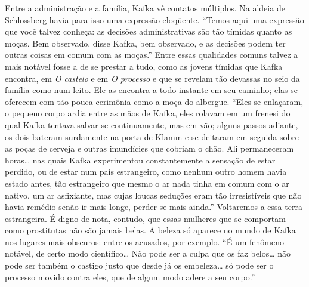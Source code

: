Entre a administração e a família, Kafka vê contatos múltiplos. Na
aldeia de Schlossberg havia para isso uma expressão eloqüente. ``Temos
aqui uma expressão que você talvez conheça: as decisões administrativas
são tão tímidas quanto as moças. Bem observado, disse Kafka, bem
observado, e as decisões podem ter outras coisas em comum com as
moças.'' Entre essas qualidades comuns talvez a mais notável fosse a de
se prestar a tudo, como as jovens tímidas que Kafka encontra, em \textit{O
castelo} e em \textit{O processo} e que se revelam tão devassas no seio da
família como num leito. Ele as encontra a todo instante em seu caminho;
elas se oferecem com tão pouca cerimônia como a moça do albergue. ``Eles
se enlaçaram, o pequeno corpo ardia entre as mãos de Kafka, eles rolavam
em um frenesi do qual Kafka tentava salvar-se continuamente, mas em vão;
alguns passos adiante, os dois bateram surdamente na porta de Klamm e se
deitaram em seguida sobre as poças de cerveja e outras imundícies que
cobriam o chão. Ali permaneceram horas\ldots{} nas quais Kafka experimentou
constantemente a sensação de estar perdido, ou de estar num país
estrangeiro, como nenhum outro homem havia estado antes, tão estrangeiro
que mesmo o ar nada tinha em comum com o ar nativo, um ar asfixiante,
mas cujas loucas seduções eram tão irresistíveis que não havia remédio
senão ir mais longe, perder-se mais ainda.'' Voltaremos a essa terra
estrangeira. É digno de nota, contudo, que essas mulheres que se
comportam como prostitutas não são jamais belas. A beleza só aparece no
mundo de Kafka nos lugares mais obscuros: entre os acusados, por
exemplo. ``É um fenômeno notável, de certo modo científico\ldots{} Não pode
ser a culpa que os faz belos\ldots{} não pode ser também o castigo justo que
desde já os embeleza\ldots{} só pode ser o processo movido contra eles, que
de algum modo adere a seu corpo.''

